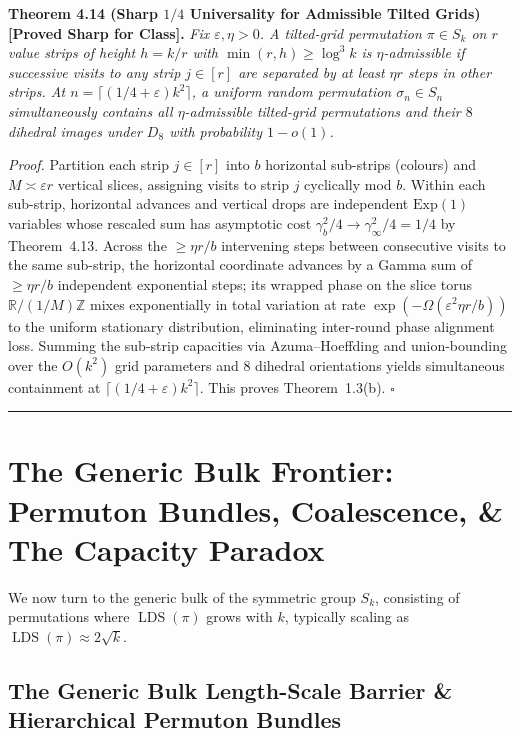\documentclass[
  11pt,
]{article}
\begin{document}
\textbf{Theorem 4.14 (Sharp \(1/4\) Universality for Admissible Tilted Grids) [Proved Sharp for Class].}
\emph{Fix \(\varepsilon, \eta > 0\). A tilted-grid permutation \(\pi \in S_k\) on \(r\) value strips of height \(h = k/r\) with \(\min(r, h) \ge \log^3 k\) is \emph{\(\eta\)-admissible} if successive visits to any strip \(j \in [r]\) are separated by at least \(\eta r\) steps in other strips. At \(n = \lceil(1/4+\varepsilon)k^2\rceil\), a uniform random permutation \(\sigma_n \in S_n\) simultaneously contains all \(\eta\)-admissible tilted-grid permutations and their \(8\) dihedral images under \(D_8\) with probability \(1 - o(1)\).}

\emph{Proof.} Partition each strip \(j \in [r]\) into \(b\) horizontal sub-strips (colours) and \(M \asymp \varepsilon r\) vertical slices, assigning visits to strip \(j\) cyclically mod \(b\). Within each sub-strip, horizontal advances and vertical drops are independent \(\mathrm{Exp}(1)\) variables whose rescaled sum has asymptotic cost \(\gamma_b^2 / 4 \to \gamma_\infty^2 / 4 = 1/4\) by Theorem~4.13. Across the \(\ge \eta r / b\) intervening steps between consecutive visits to the same sub-strip, the horizontal coordinate advances by a Gamma sum of \(\ge \eta r / b\) independent exponential steps; its wrapped phase on the slice torus \(\mathbb{R}/(1/M)\mathbb{Z}\) mixes exponentially in total variation at rate \(\exp(-\Omega(\varepsilon^2 \eta r / b))\) to the uniform stationary distribution, eliminating inter-round phase alignment loss. Summing the sub-strip capacities via Azuma--Hoeffding and union-bounding over the \(O(k^2)\) grid parameters and \(8\) dihedral orientations yields simultaneous containment at \(\lceil(1/4+\varepsilon)k^2\rceil\). This proves Theorem~1.3(b). \(\square\)

\begin{center}\rule{0.5\linewidth}{0.5pt}\end{center}

\section{The Generic Bulk Frontier: Permuton Bundles, Coalescence, \& The Capacity Paradox}\label{sec:generic-bulk}

We now turn to the generic bulk of the symmetric group $S_k$, consisting of permutations where $\operatorname{LDS}(\pi)$ grows with $k$, typically scaling as $\operatorname{LDS}(\pi) \approx 2\sqrt{k}$.

\subsection{The Generic Bulk Length-Scale Barrier \& Hierarchical Permuton Bundles}\label{sec:permuton-bundles}
\end{document}
